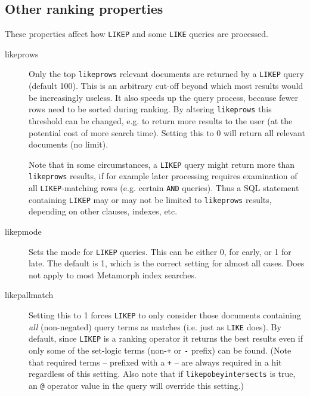 \subsection{Other ranking properties}
\label{otherrank}

  These properties affect how \verb`LIKEP` and some \verb`LIKE`
queries are processed.

\begin{description}
\item[likeprows] Only the top \verb`likeprows` relevant documents are
  returned by a \verb`LIKEP` query (default 100).  This is an
  arbitrary cut-off beyond which most results would be increasingly
  useless.  It also speeds up the query process, because fewer rows
  need to be sorted during ranking.  By altering \verb`likeprows` this
  threshold can be changed, e.g. to return more results to the user
  (at the potential cost of more search time).  Setting this to 0 will
  return all relevant documents (no limit).

Note that in some circumstances, a \verb`LIKEP` query might return
more than \verb`likeprows` results, if for example later processing
requires examination of all \verb`LIKEP`-matching rows (e.g. certain
\verb`AND` queries).  Thus a SQL statement containing \verb`LIKEP` may
or may not be limited to \verb`likeprows` results, depending on other
clauses, indexes, etc.


\item[likepmode]
  Sets the mode for \verb`LIKEP` queries.  This can be either 0, for
early, or 1 for late.  The default is 1, which is the correct setting
for almost all cases.  Does not apply to most Metamorph index searches.

\item[likepallmatch] Setting this to 1 forces \verb`LIKEP` to only
  consider those documents containing {\em all} (non-negated) query
  terms as matches (i.e. just as \verb`LIKE` does).  By default, since
  \verb`LIKEP` is a ranking operator it returns the best results even
  if only some of the set-logic terms (non-\verb`+` or \verb`-`
  prefix) can be found.  (Note that required terms -- prefixed with a
  \verb`+` -- are always required in a hit regardless of this setting.
  Also note that if {\tt likepobeyintersects} is true, an {\tt @}
  operator value in the query will override this setting.)


\end{description}
